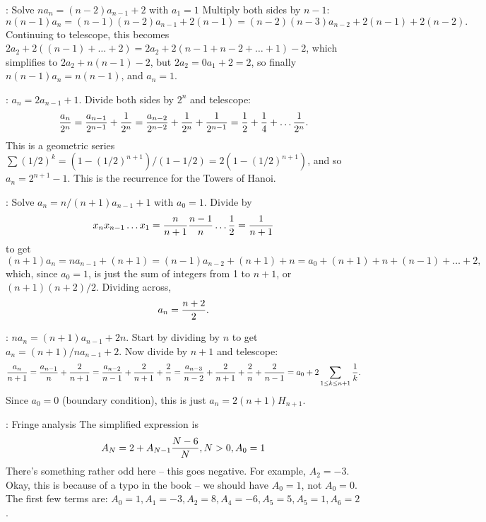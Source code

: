 : Solve $n a_n = \left(n - 2\right) a_{n-1} + 2$
with $a_1 = 1$\hfil\break
Multiply both sides by $n-1$: 
$$
n \left(n - 1\right) a_n = 
\left(n - 1 \right) \left(n - 2\right) a_{n-1} + 2 \left(n - 1\right) =
\left(n - 2 \right) \left(n - 3\right) a_{n-2} + 2 \left(n - 1\right) + 2 \left(n - 2\right).
$$
Continuing to telescope, this becomes $2 a_2 + 2 \left(\left(n - 1\right) + \ldots + 2\right)
= 2 a_2 + 2 \left(n - 1 + n - 2 + \ldots + 1\right) - 2$, which simplifies to
$2 a_2 + n \left(n - 1\right) - 2$, but $2 a_2 = 0 a_1 + 2 = 2$, so finally
$n \left(n - 1\right) a_n = n \left(n - 1\right)$, and $a_n = 1$.

: $a_n = 2 a_{n-1} + 1$.\hfil\break
Divide both sides by $2^n$ and telescope:
$$
{a_n \over 2^n} = {a_{n-1} \over 2^{n-1}} + {1 \over 2^n} =
{a_{n-2} \over 2^{n-2}} + {1 \over 2^n} + {1 \over 2^{n-1}} = {1 \over 2}
+ {1 \over 4} + \ldots {1 \over 2^n}.
$$
This is a geometric series $\sum \left(1/2\right)^k = \left(1 - \left(1/2\right)^{n+1}\right) /
\left(1 - 1/2\right) = 2 \left(1 - \left(1 / 2\right)^{n+1}\right)$, and so
$a_n = 2^{n+1} - 1$.  This is the recurrence for the Towers of Hanoi.

: Solve $a_n = n / \left(n+1\right) a_{n-1} + 1$ with 
$a_0 = 1$.\hfil\break
Divide by 
$$
 x_n x_{n-1} \ldots x_1 = {n \over n + 1} {n - 1 \over n} \ldots {1 \over 2} = {1 \over n + 1}
$$
to get
$$
 \left(n + 1\right) a_n = n a_{n-1} + \left(n + 1\right)
  = \left(n - 1\right) a_{n-2} + \left(n + 1\right) + n = a_0 + \left(n+1\right) + n +
  \left(n - 1\right) + \ldots + 2,
$$
which, since $a_0 = 1$, is just the sum of integers from 1 to $n+1$, or
$\left(n + 1\right)\left(n + 2\right) / 2$.  Dividing across,
$$ 
 a_n = {n + 2 \over 2}.
$$

: $n a_n = \left(n + 1\right) a_{n-1} + 2 n$.
\hfil\break Start by dividing by $n$ to get $a_n = \left(n + 1\right) / n a_{n-1} + 2$.
Now divide by $n+1$ and telescope:
$$
 {a_n \over n + 1} = {a_{n-1} \over n} + {2 \over n + 1} =
 {a_{n-2} \over n - 1} + {2 \over n + 1} + {2 \over n} =
 {a_{n-3} \over n - 2} + {2 \over n + 1} + {2 \over n} + {2 \over n - 1} =
 a_0 + 2 \sum_{1 \le k \le n + 1} {1 \over k}.
$$
Since $a_0 = 0$ (boundary condition), this is just $a_n = 2 \left(n + 1\right) H_{n + 1}$.

: Fringe analysis\hfil\break
The simplified expression is
$$
 A_N = 2 + A_{N-1} {N - 6 \over N}, N > 0, A_0 = 1
$$
There's something rather odd here -- this goes negative.  For example,
$A_2 = -3$.   Okay, this is because of a typo in the book -- we should have
$A_0 = 1$, not $A_0 = 0$.  The first few terms are:
$A_0 = 1, A_1 = -3, A_2 =  8, A_4=-6, A_5=5, A_5 = 1, A_6 = 2$.

